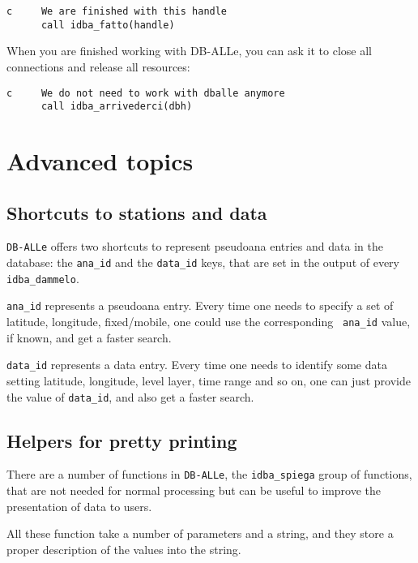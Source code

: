 \documentclass[final,12pt,a4paper,twoside]{book}
\newcommand{\dballe}{{\tt DB-ALLe}}
\begin{document}
\label{fun-idba_fatto}

\begin{verbatim}
c     We are finished with this handle
      call idba_fatto(handle)
\end{verbatim}

When you are finished working with DB-ALLe, you can ask it to close all
connections and release all resources:

\label{fun-idba_arrivederci}

\begin{verbatim}
c     We do not need to work with dballe anymore
      call idba_arrivederci(dbh)
\end{verbatim}

\chapter{Advanced topics}

\section{Shortcuts to stations and data}

\dballe{} offers two shortcuts to represent pseudoana entries and data in the
database: the {\tt ana\_id} and the {\tt data\_id} keys, that are set in the
output of every {\tt idba\_dammelo}.

{\tt ana\_id} represents a pseudoana entry.  Every time one needs to specify a
set of latitude, longitude, fixed/mobile, one could use the corresponding {\tt
ana\_id} value, if known, and get a faster search.

{\tt data\_id} represents a data entry.  Every time one needs to identify some
data setting latitude, longitude, level layer, time range and so on, one can
just provide the value of {\tt data\_id}, and also get a faster search.

\section{Helpers for pretty printing}

\label{fun-pprint}

There are a number of functions in \dballe{}, the {\tt idba\_spiega\*} group of
functions, that are not needed for normal processing but can be useful to
improve the presentation of data to users.

All these function take a number of parameters and a string, and they store a
proper description of the values into the string.
\end{document}
